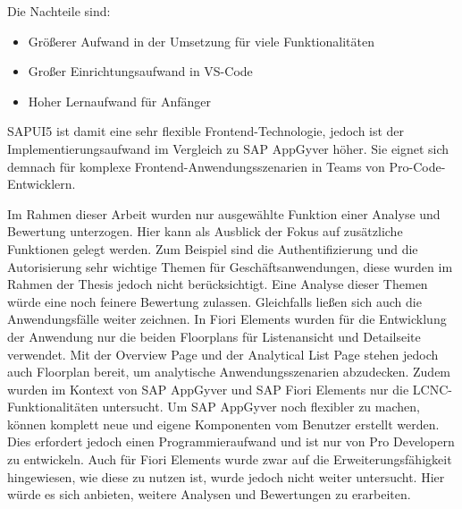 Die Nachteile sind:
\begin{itemize}[noitemsep]
\item Größerer Aufwand in der Umsetzung für viele Funktionalitäten
\item Großer Einrichtungsaufwand in VS-Code
\item Hoher Lernaufwand für Anfänger
\end{itemize}

SAPUI5 ist damit eine sehr flexible Frontend-Technologie, jedoch ist der Implementierungsaufwand im Vergleich zu SAP AppGyver höher. Sie eignet sich demnach für komplexe Frontend-Anwendungsszenarien in Teams von Pro-Code-Entwicklern.

Im Rahmen dieser Arbeit wurden nur ausgewählte Funktion einer Analyse und Bewertung unterzogen. Hier kann als Ausblick der Fokus auf zusätzliche Funktionen gelegt werden. Zum Beispiel sind die Authentifizierung und die Autorisierung sehr wichtige Themen für Geschäftsanwendungen, diese wurden im Rahmen der Thesis jedoch nicht berücksichtigt. Eine Analyse dieser Themen würde eine noch feinere Bewertung zulassen. Gleichfalls ließen sich auch die Anwendungsfälle weiter zeichnen. In Fiori Elements wurden für die Entwicklung der Anwendung nur die beiden Floorplans für Listenansicht und Detailseite verwendet. Mit der Overview Page und der Analytical List Page stehen jedoch auch Floorplan bereit, um analytische Anwendungsszenarien abzudecken. Zudem wurden im Kontext von SAP AppGyver und SAP Fiori Elements nur die LCNC-Funktionalitäten untersucht. Um SAP AppGyver noch flexibler zu machen, können komplett neue und eigene Komponenten vom Benutzer erstellt werden. Dies erfordert jedoch einen Programmieraufwand und ist nur von Pro Developern zu entwickeln. Auch für Fiori Elements wurde zwar auf die Erweiterungsfähigkeit hingewiesen, wie diese zu nutzen ist, wurde jedoch nicht weiter untersucht. Hier würde es sich anbieten, weitere Analysen und Bewertungen zu erarbeiten.


